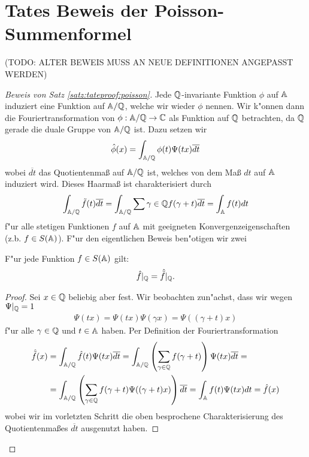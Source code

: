 \section{Tates Beweis der Poisson-Summenformel}
	(TODO: ALTER BEWEIS MUSS AN NEUE DEFINITIONEN ANGEPASST WERDEN)
	\begin{proof}[Beweis von Satz \ref{satz:tateproof:poisson}]
		Jede $\mathbb{Q}$-invariante Funktion $\phi$ auf $\mathbb{A}$ induziert eine Funktion auf $\mathbb{A}/\mathbb{Q}$, welche wir wieder $\phi$ nennen.
		Wir k"onnen dann die Fouriertransformation von $\phi: \mathbb{A}/\mathbb{Q} \rightarrow \mathbb{C}$ als Funktion auf $\mathbb{Q}$ betrachten, da $\mathbb{Q}$ gerade die duale Gruppe von $\mathbb{A}/\mathbb{Q}$ ist. Dazu setzen wir
		\begin{align*}
			\hat{\phi}(x) = \int_{\mathbb{A}/\mathbb{Q}}\phi(t)\Psi(tx)\overline{dt}
		\end{align*}
		wobei $\overline{dt}$ das Quotientenmaß auf $\mathbb{A}/\mathbb{Q}$ ist, welches von dem Maß $dt$ auf $\mathbb{A}$ induziert wird. Dieses Haarmaß ist charakterisiert durch
		\begin{align*}
			\int_{\mathbb{A}/\mathbb{Q}}\tilde{f}(t)\overline{dt} =
			\int_{\mathbb{A}/\mathbb{Q}}\sum{\gamma \in \mathbb{Q}}f(\gamma+t)\overline{dt} =
			\int_{\mathbb{A}} f(t)dt
		\end{align*}
		f"ur alle stetigen Funktionen $f$ auf $\mathbb{A}$ mit geeigneten Konvergenzeigenschaften (z.b. $f\in S(\mathbb{A})$). F"ur den eigentlichen Beweis ben"otigen wir zwei
		
		\begin{lemma}
			F"ur jede Funktion $f \in S(\mathbb{A})$ gilt:
			\begin{align*}
				\hat{f}|_{\mathbb{Q}} = \hat{\tilde{f}}|_{\mathbb{Q}}.
			\end{align*}
		\end{lemma}
		\begin{proof}
			Sei $x \in \mathbb{Q}$ beliebig aber fest. Wir beobachten zun"achst, dass wir wegen $\Psi|_{\mathbb{Q}} =1$
			\begin{align*}
				\Psi(tx)= \Psi(tx)\Psi(\gamma x)=\Psi((\gamma + t) x)
			\end{align*}
			f"ur alle $\gamma \in \mathbb{Q}$ und $t\in \mathbb{A}$ haben. Per Definition der Fouriertransformation
			\begin{align*}
				\hat{\tilde{f}}(x)	&= \int_{\mathbb{A} / \mathbb{Q}} {\hat{f}(t)\Psi(tx)\overline{dt}} 
									 = \int_{\mathbb{A} / \mathbb{Q}} \left(\sum_{\gamma \in \mathbb{Q}}{f(\gamma + t)}\right)\Psi(tx)\overline{dt} =\\
									&= \int_{\mathbb{A} / \mathbb{Q}} \left(\sum_{\gamma \in \mathbb{Q}}{f(\gamma + t)}\Psi((\gamma + t)x)\right)\overline{dt}
									 = \int_{\mathbb{A}} f(t)\Psi(tx)dt = \hat{f}(x)
			\end{align*}
			wobei wir im vorletzten Schritt die oben besprochene Charakterisierung des Quotientenmaßes $\overline{dt}$ ausgenutzt haben.
		\end{proof}
		

\end{proof}
